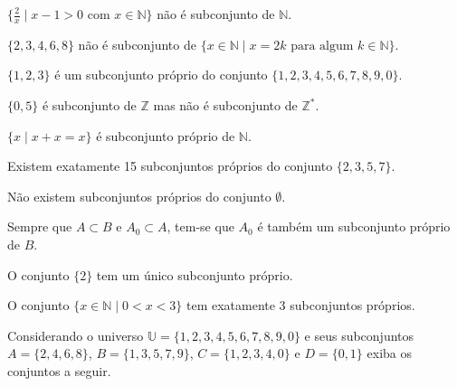 \begin{exerList}
	\item $\{\frac{2}{x} \mid x - 1 > 0 \mbox{ com } x \in \mathbb{N}\}$ não é subconjunto de $\mathbb{N}$. 
	\item $\{2, 3, 4, 6, 8\}$ não é subconjunto de $\{x \in \mathbb{N} \mid  x = 2k \mbox{ para algum } k \in \mathbb{N}\}$.
	\item $\{1, 2, 3\}$ é um subconjunto próprio do conjunto $\{1, 2, 3, 4, 5, 6, 7,8,9,0\}$.
	\item $\{0, 5\}$ é subconjunto de $\mathbb{Z}$ mas não é subconjunto de $\mathbb{Z}^*$.
	\item $\{ x \mid x + x = x\}$ é subconjunto próprio de $\mathbb{N}$.
	\item Existem exatamente 15 subconjuntos próprios do conjunto $\{2, 3, 5, 7\}$.
	\item Não existem subconjuntos próprios do conjunto $\emptyset$.
	\item Sempre que $A \subset B$ e $A_0 \subset A$, tem-se que $A_0$ é também um subconjunto próprio de $B$.
	\item O conjunto $\{2\}$ tem um único subconjunto próprio.
	\item O conjunto $\{x \in \mathbb{N} \mid 0 < x < 3\}$ tem exatamente 3 subconjuntos próprios.
\end{exerList}

\begin{problem}\label{prob:Conjuntos9}
	Considerando o universo $\mathbb{U} = \{1, 2, 3, 4, 5, 6, 7, 8, 9, 0\}$ e seus subconjuntos $A = \{2, 4, 6, 8\}$, $B = \{1, 3, 5, 7, 9\}$, $C = \{1, 2, 3, 4, 0\}$ e $D = \{0, 1\}$ exiba os conjuntos a seguir.
\end{problem}

